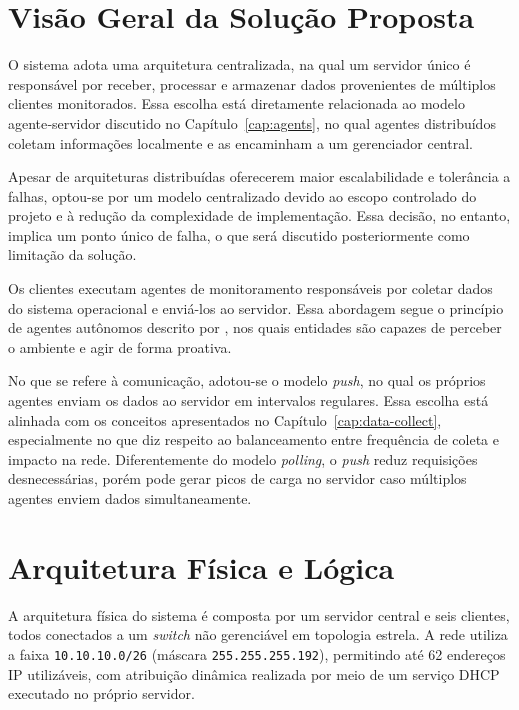 \documentclass[
    12pt
    ,oneside
    ,a4paper
    ,chapter=TITLE
    ,section=TITLE
    ,sumario=abnt-6027-2012]{abntex2}
\begin{document}
\section{Visão Geral da Solução Proposta}

O sistema adota uma arquitetura centralizada, na qual um servidor único é responsável por receber, processar e armazenar dados provenientes de múltiplos clientes monitorados. Essa escolha está diretamente relacionada ao modelo agente‑servidor discutido no Capítulo~\ref{cap:agents}, no qual agentes distribuídos coletam informações localmente e as encaminham a um gerenciador central.

Apesar de arquiteturas distribuídas oferecerem maior escalabilidade e tolerância a falhas, optou-se por um modelo centralizado devido ao escopo controlado do projeto e à redução da complexidade de implementação. Essa decisão, no entanto, implica um ponto único de falha, o que será discutido posteriormente como limitação da solução.

Os clientes executam agentes de monitoramento responsáveis por coletar dados do sistema operacional e enviá-los ao servidor. Essa abordagem segue o princípio de agentes autônomos descrito por , nos quais entidades são capazes de perceber o ambiente e agir de forma proativa.

No que se refere à comunicação, adotou-se o modelo \textit{push}, no qual os próprios agentes enviam os dados ao servidor em intervalos regulares. Essa escolha está alinhada com os conceitos apresentados no Capítulo~\ref{cap:data-collect}, especialmente no que diz respeito ao balanceamento entre frequência de coleta e impacto na rede. Diferentemente do modelo \textit{polling}, o \textit{push} reduz requisições desnecessárias, porém pode gerar picos de carga no servidor caso múltiplos agentes enviem dados simultaneamente.

\section{Arquitetura Física e Lógica}

A arquitetura física do sistema é composta por um servidor central e seis clientes, todos conectados a um \textit{switch} não gerenciável em topologia estrela. A rede utiliza a faixa \texttt{10.10.10.0/26} (máscara \texttt{255.255.255.192}), permitindo até 62 endereços IP utilizáveis, com atribuição dinâmica realizada por meio de um serviço DHCP executado no próprio servidor.
\end{document}
